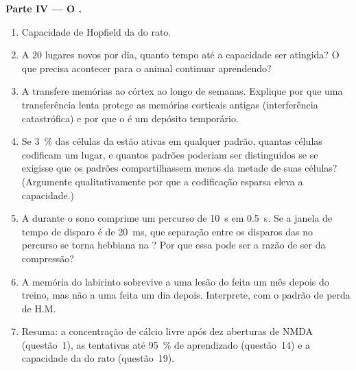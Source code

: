 \begin{problem}
\medskip
\noindent\textbf{Parte IV --- O .}
\begin{enumerate}[resume]
  \item Capacidade de Hopfield da  do rato.
  \item A $20$ lugares novos por dia, quanto tempo até a capacidade ser
        atingida? O que precisa acontecer para o animal continuar
        aprendendo?
  \item A  transfere memórias ao córtex ao longo de semanas.
        Explique por que uma transferência lenta protege as memórias
        corticais antigas (interferência catastrófica) e por que o
         é um depósito temporário.
  \item Se \qty{3}{\%} das células da  estão ativas em qualquer
        padrão, quantas células codificam um lugar, e quantos padrões
        poderiam ser distinguidos se se exigisse que os padrões
        compartilhassem menos da metade de suas células? (Argumente
        qualitativamente por que a codificação esparsa eleva a
        capacidade.)
  \item A  durante o sono comprime um percurso de \qty{10}{s}
        em \qty{0.5}{s}. Se a janela de tempo de disparo é de
        \qty{20}{ms}, que separação entre os disparos das  no percurso se torna hebbiana na ? Por que essa
        pode ser a razão de ser da compressão?
  \item A memória do labirinto sobrevive a uma lesão do  feita
        um mês depois do treino, mas não a uma feita um dia depois.
        Interprete, com o padrão de perda de H.M.
  \item Resuma: a concentração de cálcio livre após dez aberturas de
        NMDA (questão~1), as tentativas até \qty{95}{\%} de aprendizado
        (questão~14) e a capacidade da  do rato (questão~19).
\end{enumerate}
\end{problem}
